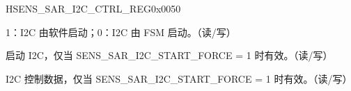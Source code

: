     
    \begin{register}{H}{SENS\_SAR\_I2C\_CTRL\_REG}{0x0050}\label{regdesc:SENSSARI2CCTRLREG}
    \regnewline%
    \begin{regdesc}\begin{reglist}
    \item [SENS\_SAR\_I2C\_START\_FORCE]1：I2C 由软件启动；0：I2C 由 FSM 启动。（读/写）
    \item [SENS\_SAR\_I2C\_START]启动 I2C，仅当 SENS\_SAR\_I2C\_START\_FORCE = 1 时有效。（读/写）
    \item [SENS\_SAR\_I2C\_CTRL]I2C 控制数据，仅当 SENS\_SAR\_I2C\_START\_FORCE  = 1 时有效。（读/写）
    \end{reglist}\end{regdesc}
    \end{register}
    
    